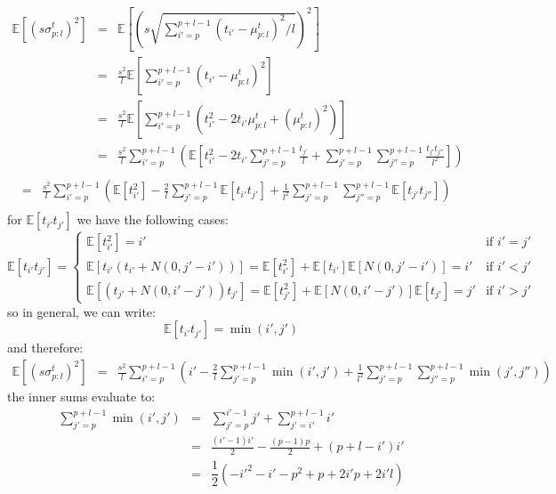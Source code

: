 \documentclass[12pt,a4paper]{article}
\newcommand{\subsmean}[2]{\mu^t_{#1:#2}} %
\newcommand{\subsvar}[2]{\sigma^t_{#1:#2}} %
\newcommand{\expectation}[1]{\mathbb{E}\left[#1\right]} %
\newcommand{\subsmeanpl}{\subsmean{p}{l}} %
\newcommand{\subsvarpl}{\subsvar{p}{l}} %
\begin{document}
$$\begin{array}{rcl}
    \expectation{(s\subsvarpl)^2} & = & \expectation{\left(s\sqrt{\sum_{i'=p}^{p+l-1}\left(t_{i'}-\subsmeanpl\right)^2/l}\right)^2} \\[16pt]
    & = & \frac{s^2}{l}\expectation{\sum_{i'=p}^{p+l-1}\left(t_{i'}-\subsmeanpl\right)^2} \\[16pt] 
    & = & \frac{s^2}{l}\expectation{\sum_{i'=p}^{p+l-1}\left(t_{i'}^2-2t_{i'}\subsmeanpl+(\subsmeanpl)^2\right)} \\[16pt]
    & = & \frac{s^2}{l}\sum_{i'=p}^{p+l-1}\left(\expectation{t_{i'}^2-2t_{i'}\sum_{j'=p}^{p+l-1}\frac{t_{j'}}{l}+\sum_{j'=p}^{p+l-1}\sum_{j''=p}^{p+l-1}\frac{t_{j'}t_{j''}}{l^2}}\right) \\[16pt]
\end{array}$$
$$\begin{array}{rcl}
    & = & \frac{s^2}{l}\sum_{i'=p}^{p+l-1}\left(\expectation{t_{i'}^2}-\frac{2}{l}\sum_{j'=p}^{p+l-1}\expectation{t_{i'}t_{j'}}+\frac{1}{l^2}\sum_{j'=p}^{p+l-1}\sum_{j''=p}^{p+l-1}\expectation{t_{j'}t_{j''}}\right) \\[16pt]
\end{array}$$
for $\expectation{t_{i'}t_{j'}}$ we have the following cases:
$$\expectation{t_{i'}t_{j'}}=\begin{cases}
    \expectation{t_{i'}^2} = i' & \text{if } i' = j' \\[4pt]
    \expectation{t_{i'}(t_{i'}+N(0,j'-i'))} = \expectation{t_{i'}^2} + \expectation{t_{i'}}\expectation{N(0,j'-i')} = i' & \text{if } i' < j' \\[4pt]
    \expectation{(t_{j'}+N(0,i'-j'))t_{j'}} = \expectation{t_{j'}^2} + \expectation{N(0,i'-j')}\expectation{t_{j'}} = j' & \text{if } i' > j'
\end{cases}$$
so in general, we can write:
$$\expectation{t_{i'}t_{j'}}=\min(i',j')$$
and therefore:
$$\begin{array}{rcl}
    \expectation{(s\subsvarpl)^2} & = & \frac{s^2}{l}\sum_{i'=p}^{p+l-1}\left(i'-\frac{2}{l}\sum_{j'=p}^{p+l-1}\min(i',j')+\frac{1}{l^2}\sum_{j'=p}^{p+l-1}\sum_{j''=p}^{p+l-1}\min(j',j'')\right)
\end{array}$$
the inner sums evaluate to:
$$\begin{array}{rcl}
    \sum_{j'=p}^{p+l-1}\min(i',j') & = & \sum_{j'=p}^{i'-1}j' + \sum_{j'=i'}^{p+l-1}i' \\[8pt]
    & = & \frac{(i'-1)i'}{2} - \frac{(p-1)p}{2} + (p+l-i')i' \\[8pt]
    & = & \dfrac{1}{2}\left(-i'^2-i'-p^2+p+2i'p+2i'l\right)
\end{array}$$
\end{document}
